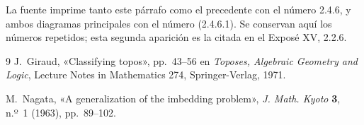 La fuente imprime tanto este párrafo como el precedente con el número 2.4.6,
y ambos diagramas principales con el número (2.4.6.1). Se conservan aquí los
números repetidos; esta segunda aparición es la citada en el Exposé XV,
2.2.6.

\renewcommand{\refname}{Bibliografía}
\begin{thebibliography}{9}
J.~Giraud, «Classifying topos», pp.~43--56 en
\emph{Toposes, Algebraic Geometry and Logic},
Lecture Notes in Mathematics 274, Springer-Verlag, 1971.

M.~Nagata, «A generalization of the imbedding problem»,
\emph{J. Math. Kyoto} \textbf{3}, n.º~1 (1963), pp.~89--102.
\end{thebibliography}
